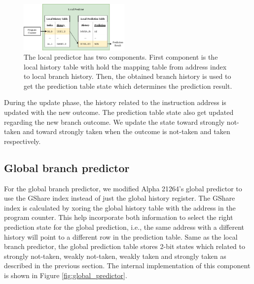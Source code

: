 \documentclass[conference]{IEEEtran}
\begin{document}
\begin{figure}[h]
    \centering
    \includegraphics[width=0.48\textwidth]{imgs/local_predictor}
    \caption{The local predictor has two components. First component is the local history table with
    hold the mapping table from address index to local branch history. Then, the obtained branch history
    is used to get the prediction table state which determines the prediction result.}
    \label{fig:local_predictor}
\end{figure}

During the update phase, the history related to the instruction address is updated with the new outcome.
The prediction table state also get updated regarding the new branch outcome. We update the state toward
strongly not-taken and toward strongly taken when the outcome is not-taken and taken respectively.



\subsection{Global branch predictor}

For the global branch predictor, we modified Alpha 21264's global predictor to use the GShare index
instead of just the global history register. The GShare index is calculated by xoring the global history
table with the address in the program counter. This help incorporate both information to select the right
prediction state for the global prediction, i.e., the same address with a different history will point to a
different row in the prediction table. Same as the local branch predictor, the global prediction table stores
2-bit states which related to strongly not-taken, weakly not-taken, weakly taken and strongly taken as described
in the previous section. The internal implementation of this component is shown in Figure \ref{fig:global_predictor}.
\end{document}
